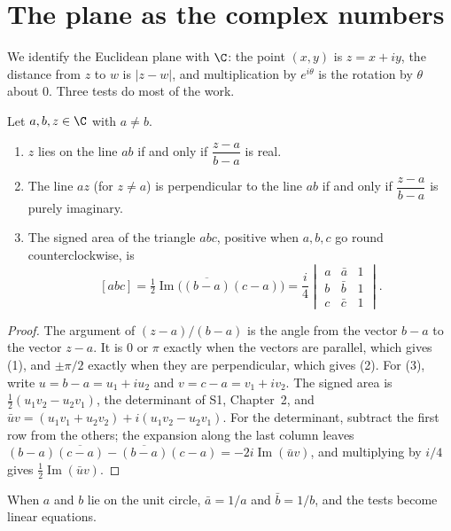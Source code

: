 \section{The plane as the complex numbers}

We identify the Euclidean plane with $\C$: the point $(x,y)$ is $z=x+iy$, the distance from $z$ to $w$ is $|z-w|$, and
multiplication by $e^{i\theta}$ is the rotation by $\theta$ about $0$. Three tests do most of the work.

\begin{proposition}\label{prop:tests}
Let $a,b,z\in\C$ with $a\ne b$.
\begin{enumerate}
\item $z$ lies on the line $ab$ if and only if $\dfrac{z-a}{b-a}$ is real.
\item The line $az$ (for $z\ne a$) is perpendicular to the line $ab$ if and only if $\dfrac{z-a}{b-a}$ is purely imaginary.
\item The signed area of the triangle $abc$, positive when $a,b,c$ go round counterclockwise, is
\[
[abc]=\tfrac12\operatorname{Im}\bigl(\overline{(b-a)}(c-a)\bigr)=\frac i4\begin{vmatrix}a&\bar a&1\\ b&\bar b&1\\ c&\bar c&1\end{vmatrix}.
\]
\end{enumerate}
\end{proposition}
\begin{proof}
The argument of $(z-a)/(b-a)$ is the angle from the vector $b-a$ to the vector $z-a$. It is $0$ or $\pi$ exactly when the
vectors are parallel, which gives (1), and $\pm\pi/2$ exactly when they are perpendicular, which gives (2). For (3), write
$u=b-a=u_1+iu_2$ and $v=c-a=v_1+iv_2$. The signed area is $\frac12(u_1v_2-u_2v_1)$, the determinant of S1, Chapter~2, and
$\bar uv=(u_1v_1+u_2v_2)+i(u_1v_2-u_2v_1)$. For the determinant, subtract the first row from the others; the expansion
along the last column leaves $(b-a)\overline{(c-a)}-\overline{(b-a)}(c-a)=-2i\operatorname{Im}(\bar uv)$, and multiplying by
$i/4$ gives $\frac12\operatorname{Im}(\bar uv)$.
\end{proof}

When $a$ and $b$ lie on the unit circle, $\bar a=1/a$ and $\bar b=1/b$, and the tests become linear equations.

